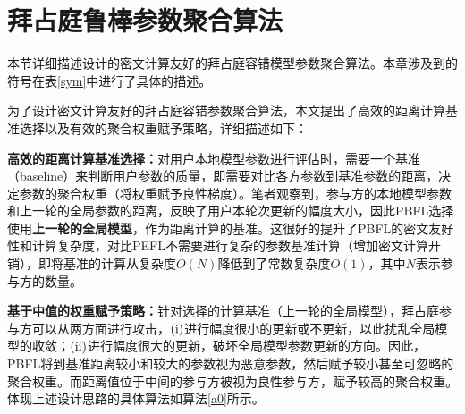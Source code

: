 \section{拜占庭鲁棒参数聚合算法}\label{friendly-alg}
本节详细描述设计的密文计算友好的拜占庭容错模型参数聚合算法。本章涉及到的符号在表\ref{sym}中进行了具体的描述。

为了设计密文计算友好的拜占庭容错参数聚合算法，本文提出了高效的距离计算基准选择以及有效的聚合权重赋予策略，详细描述如下：
\begin{compactitem}
	\item \textbf{高效的距离计算基准选择：}对用户本地模型参数进行评估时，需要一个基准（baseline）来判断用户参数的质量，即需要对比各方参数到基准参数的距离，决定参数的聚合权重（将权重赋予良性梯度）。笔者观察到，参与方的本地模型参数和上一轮的全局参数的距离，反映了用户本轮次更新的幅度大小，因此PBFL选择使用\textbf{上一轮的全局模型}，作为距离计算的基准。这很好的提升了PBFL的密文友好性和计算复杂度，对比PEFL\cite{liu2021privacy}不需要进行复杂的参数基准计算（增加密文计算开销），即将基准的计算从复杂度$ O(N) $降低到了常数复杂度$ O(1) $，其中$N$表示参与方的数量。
	\item \textbf{基于中值的权重赋予策略：}针对选择的计算基准（上一轮的全局模型），拜占庭参与方可以从两方面进行攻击，$(\rm \romannumeral1)$进行幅度很小的更新或不更新，以此扰乱全局模型的收敛；$(\rm \romannumeral2)$进行幅度很大的更新，破坏全局模型参数更新的方向。因此，PBFL将到基准距离较小和较大的参数视为恶意参数，然后赋予较小甚至可忽略的聚合权重。而距离值位于中间的参与方被视为良性参与方，赋予较高的聚合权重。体现上述设计思路的具体算法如算法\ref{a0}所示。
\end{compactitem}
